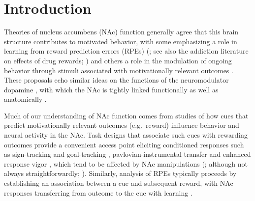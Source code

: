 \documentclass[11pt]{article}
\let\cite=\citep
\let\citeNP=\citealt
\begin{document}
\newpage

\section*{Introduction}

Theories of nucleus accumbens (NAc) function generally agree that this
brain structure contributes to motivated behavior, with some
emphasizing a role in learning from reward prediction errors (RPEs) (\citeNP{Joel2002,Maia2009,Khamassi2012,Lee2012,Schultz2016,Averbeck2017}; see
  also the addiction literature on effects of drug
  rewards; \citeNP{Kalivas2005,Hyman2006,Carelli2009}) and others a role in
the modulation of ongoing behavior through stimuli associated with
motivationally relevant outcomes \cite[invigorating,
  directing;][]{Nicola2010a,Salamone2012,Floresco2015}. These
proposals echo similar ideas on the functions of the neuromodulator
dopamine \cite{Maia2009,Berridge2012,Salamone2012,Schultz2016}, with
which the NAc is tightly linked functionally as well as anatomically
\cite{Cheer2007,Ikemoto2007,DuHoffmann2014,Takahashi2016}.

Much of our understanding of NAc function comes from studies of how
cues that predict motivationally relevant outcomes (e.g.\ reward)
influence behavior and neural activity in the NAc. Task designs that
associate such cues with rewarding outcomes provide a convenient
access point eliciting conditioned responses such as sign-tracking and
goal-tracking \cite{hearst1974sign,Robinson2009},
pavlovian-instrumental transfer \cite{Estes1943,Rescorla1967} and
enhanced response vigor \cite{Niv2007,Nicola2010a}, which tend to be
affected by NAc manipulations (\citeNP{Corbit2011,Flagel2011,Chang2012};
although not always
  straightforwardly; \citeNP{Giertler2004,Chang2013}). Similarly, analysis
of RPEs typically proceeds by establishing an association between a
cue and subsequent reward, with NAc responses transferring from
outcome to the cue with learning
\cite{Schultz1997,Setlow2003,Roitman2005,Day2007a}.
\end{document}
